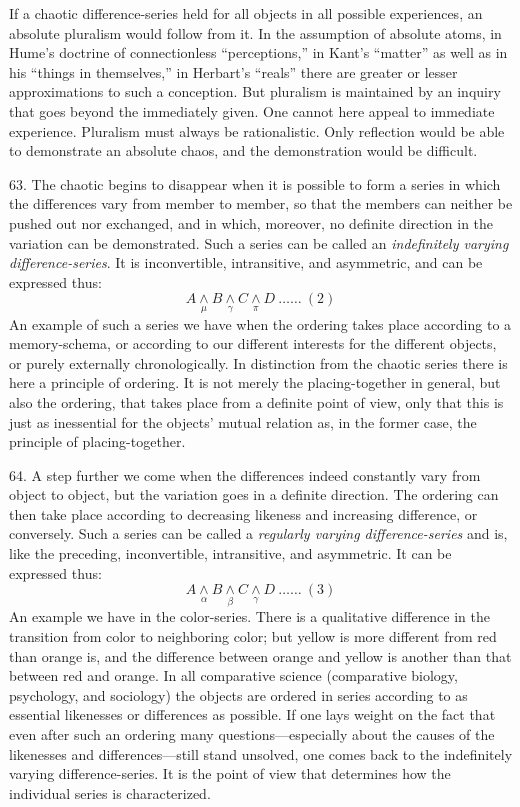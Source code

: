 \documentclass[12pt,a4paper]{book}
\newcommand{\opage}[1]{\marginnote{\footnotesize\textit{[#1]}}}
\begin{document}
If a chaotic difference-series held for all objects in all possible
experiences, an absolute pluralism would follow from it. In the assumption
of absolute atoms, in Hume's doctrine of connectionless ``perceptions,'' in
Kant's ``matter'' as well as in his ``things in themselves,'' in Herbart's
``reals'' there are greater or lesser approximations to such a conception.
But pluralism is maintained by an inquiry that goes beyond the immediately
given. One cannot here appeal to immediate experience. Pluralism must always
be rationalistic. Only reflection would be able to demonstrate an absolute
chaos, and the demonstration would be difficult.

63. The chaotic begins to disappear when it is \opage{166}possible to form a series in
which the differences vary from member to member, so that the members can
neither be pushed out nor exchanged, and in which, moreover, no definite
direction in the variation can be demonstrated. Such a series can be called
an \emph{indefinitely varying difference-series}. It is inconvertible,
intransitive, and asymmetric, and can be expressed thus:
\[ A \underset{\mu}{\wedge} B \underset{\gamma}{\wedge} C \underset{\pi}{\wedge} D \ \ldots\ldots\ (2) \]
An example of such a series we have when the ordering takes place according
to a memory-schema, or according to our different interests for the
different objects, or purely externally chronologically. In distinction from
the chaotic series there is here a principle of ordering. It is not merely
the placing-together in general, but also the ordering, that takes place
from a definite point of view, only that this is just as inessential for the
objects' mutual relation as, in the former case, the principle of
placing-together.

64. A step further we come when the differences indeed constantly vary from
object to object, but the variation goes in a definite direction. The
ordering can then take place according to decreasing likeness and increasing
difference, or conversely. Such a series can be called a \emph{regularly
varying difference-series} and is, like the preceding, inconvertible,
intransitive, and asymmetric. It can be expressed thus:
\[ A \underset{\alpha}{\wedge} B \underset{\beta}{\wedge} C \underset{\gamma}{\wedge} D \ \ldots\ldots\ (3) \]
An example we have in the color-series. There is a qualitative difference in
the transition from color to neighboring color; but yellow is more different
from red than orange is, and the difference between orange and yellow is
another than that between red and orange. In all comparative science
(comparative biology, psychology, and sociology) the objects are ordered in
series according to as essential likenesses or differences as possible. If
one lays weight on the fact that even after such an ordering many
questions---especially about the causes of the likenesses and
differences---still stand unsolved, one comes back to the \opage{167}indefinitely
varying difference-series. It is the point of view that determines how the
individual series is characterized.
\end{document}
